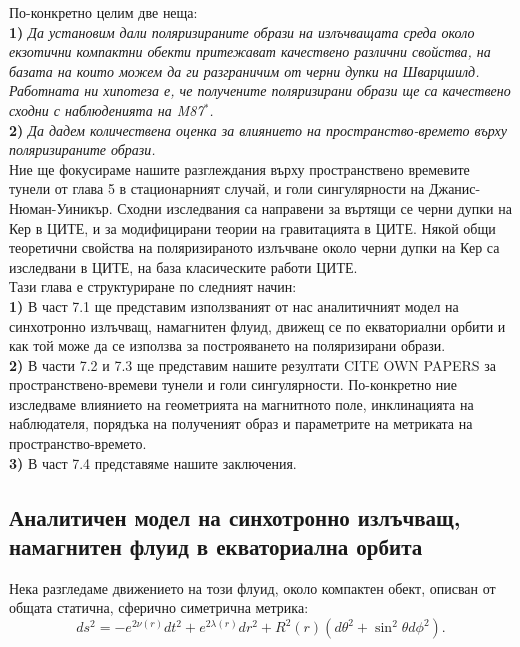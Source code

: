 По-конкретно целим две неща: \\

\textbf{1)} \emph{Да установим дали поляризираните образи на излъчващата среда около екзотични компактни обекти притежават качествено различни свойства, на базата на които можем да ги разграничим от черни дупки на Шварцшилд. Работната ни хипотеза е, че получените поляризирани образи ще са качествено сходни с наблюденията на M87$^*$.}\\

\textbf{2)} \emph{Да дадем количествена оценка за влиянието на пространство-времето върху поляризираните образи.}\\

Ние ще фокусираме нашите разглеждания върху пространствено времевите тунели от глава 5 в стационарният случай, и голи сингулярности на Джанис-Нюман-Уиникър. Сходни изследвания са направени за въртящи се черни дупки на Кер в ЦИТЕ, и за модифицирани теории на гравитацията в ЦИТЕ. Някой общи теоретични свойства на поляризираното излъчване около черни дупки на Кер са изследвани в ЦИТЕ, на база класическите работи ЦИТЕ.\\

Тази глава е структуриране по следният начин: \\

\textbf{1)} В част 7.1 ще представим използваният от нас аналитичният модел на синхотронно излъчващ, намагнитен флуид, движещ се по екваториални орбити и как той може да се използва за построяването на поляризирани образи.\\

\textbf{2)} В части 7.2 и 7.3 ще представим нашите резултати CITE OWN PAPERS за пространствено-времеви тунели и голи сингулярности. По-конкретно ние изследваме влиянието на геометрията на магнитното поле, инклинацията на наблюдателя, порядъка на полученият образ и параметрите на метриката на пространство-времето.\\

\textbf{3)} В част 7.4 представяме нашите заключения. 

\subsection{Аналитичен модел на синхотронно излъчващ, намагнитен флуид в екваториална орбита}

Нека разгледаме движението на този флуид, около компактен обект, описван от общата статична, сферично симетрична метрика:
\begin{equation}
	ds^2 = - e^{2\nu(r)}dt^2 + e^{2\lambda(r)}dr^2 + R^2(r)\left(d\theta^2 + \sin^2\theta d\phi^2\right).
\end{equation}

